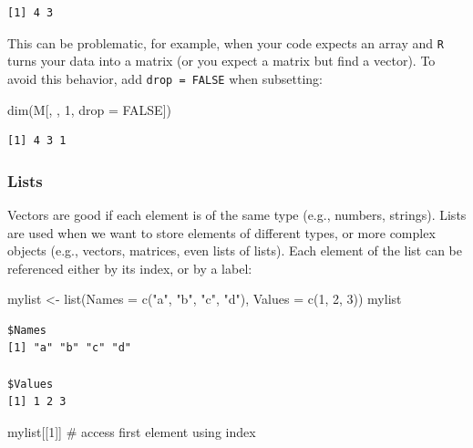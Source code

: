 \documentclass[
  letterpaper,
  DIV=11,
  numbers=noendperiod]{scrreprt}
\newenvironment{Shaded}{\begin{snugshade}}{\end{snugshade}}
\newcommand{\AttributeTok}[1]{\textcolor[rgb]{0.40,0.45,0.13}{#1}}
\newcommand{\CommentTok}[1]{\textcolor[rgb]{0.37,0.37,0.37}{#1}}
\newcommand{\ConstantTok}[1]{\textcolor[rgb]{0.56,0.35,0.01}{#1}}
\newcommand{\DecValTok}[1]{\textcolor[rgb]{0.68,0.00,0.00}{#1}}
\newcommand{\FunctionTok}[1]{\textcolor[rgb]{0.28,0.35,0.67}{#1}}
\newcommand{\NormalTok}[1]{\textcolor[rgb]{0.00,0.23,0.31}{#1}}
\newcommand{\OtherTok}[1]{\textcolor[rgb]{0.00,0.23,0.31}{#1}}
\newcommand{\StringTok}[1]{\textcolor[rgb]{0.13,0.47,0.30}{#1}}
\begin{document}
\begin{verbatim}
[1] 4 3
\end{verbatim}

This can be problematic, for example, when your code expects an array
and \texttt{R} turns your data into a matrix (or you expect a matrix but
find a vector). To avoid this behavior, add \texttt{drop\ =\ FALSE} when
subsetting:

\begin{Shaded}
\begin{Highlighting}[]
\FunctionTok{dim}\NormalTok{(M[, , }\DecValTok{1}\NormalTok{, }\AttributeTok{drop =} \ConstantTok{FALSE}\NormalTok{])}
\end{Highlighting}
\end{Shaded}

\begin{verbatim}
[1] 4 3 1
\end{verbatim}

\hypertarget{lists}{%
\subsubsection{Lists}\label{lists}}

Vectors are good if each element is of the same type (e.g., numbers,
strings). Lists are used when we want to store elements of different
types, or more complex objects (e.g., vectors, matrices, even lists of
lists). Each element of the list can be referenced either by its index,
or by a label:

\begin{Shaded}
\begin{Highlighting}[]
\NormalTok{mylist }\OtherTok{\textless{}{-}} \FunctionTok{list}\NormalTok{(}\AttributeTok{Names =} \FunctionTok{c}\NormalTok{(}\StringTok{"a"}\NormalTok{, }\StringTok{"b"}\NormalTok{, }\StringTok{"c"}\NormalTok{, }\StringTok{"d"}\NormalTok{), }\AttributeTok{Values =} \FunctionTok{c}\NormalTok{(}\DecValTok{1}\NormalTok{, }\DecValTok{2}\NormalTok{, }\DecValTok{3}\NormalTok{))}
\NormalTok{mylist}
\end{Highlighting}
\end{Shaded}

\begin{verbatim}
$Names
[1] "a" "b" "c" "d"

$Values
[1] 1 2 3
\end{verbatim}

\begin{Shaded}
\begin{Highlighting}[]
\NormalTok{mylist[[}\DecValTok{1}\NormalTok{]] }\CommentTok{\# access first element using index}
\end{Highlighting}
\end{Shaded}
\end{document}
